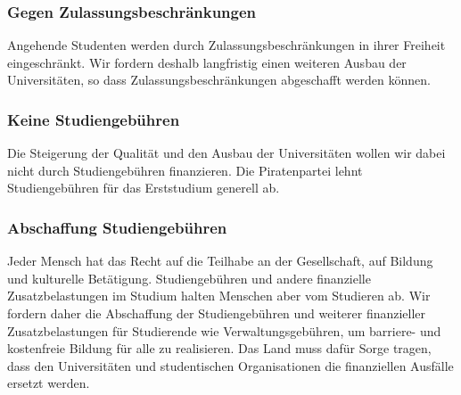 \label{wp:bildung:beschraenkung}

\subsubsection{Gegen Zulassungsbeschränkungen}
\abstimmung
Angehende Studenten werden durch Zulassungsbeschränkungen in ihrer Freiheit eingeschränkt. Wir fordern deshalb langfristig einen weiteren Ausbau der Universitäten, so dass Zulassungsbeschränkungen abgeschafft werden können.
 
\label{wp:bildung:gebuehren1}

\subsubsection{Keine Studiengebühren}
\abstimmung
Die Steigerung der Qualität und den Ausbau der Universitäten wollen wir dabei nicht durch Studiengebühren finanzieren. Die Piratenpartei lehnt Studiengebühren für das Erststudium generell ab.
 

\label{wp:bildung:gebuehren2}

\subsubsection{Abschaffung Studiengebühren}
\abstimmung
Jeder Mensch hat das Recht auf die Teilhabe an der Gesellschaft, auf Bildung und kulturelle Betätigung. Studiengebühren und andere finanzielle Zusatzbelastungen im Studium halten Menschen aber vom Studieren ab. Wir fordern daher die Abschaffung der Studiengebühren und weiterer finanzieller Zusatzbelastungen für Studierende wie Verwaltungsgebühren, um barriere- und kostenfreie Bildung für alle zu realisieren. Das Land muss dafür Sorge tragen, dass den Universitäten und studentischen Organisationen die finanziellen Ausfälle ersetzt werden.
 

